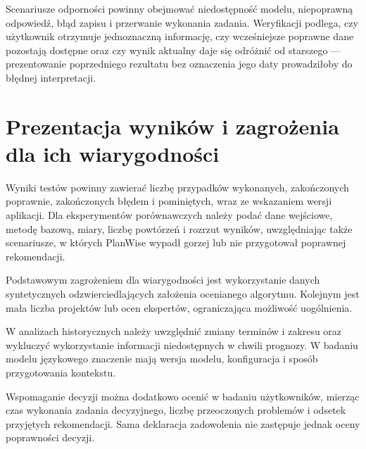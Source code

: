 Scenariusze odporności powinny obejmować niedostępność modelu, niepoprawną odpowiedź, błąd zapisu i przerwanie wykonania zadania. Weryfikacji podlega, czy użytkownik otrzymuje jednoznaczną informację, czy wcześniejsze poprawne dane pozostają dostępne oraz czy wynik aktualny daje się odróżnić od starszego — prezentowanie poprzedniego rezultatu bez oznaczenia jego daty prowadziłoby do błędnej interpretacji.

\section{Prezentacja wyników i zagrożenia dla ich wiarygodności}

Wyniki testów powinny zawierać liczbę przypadków wykonanych, zakończonych poprawnie, zakończonych błędem i pominiętych, wraz ze wskazaniem wersji aplikacji. Dla eksperymentów porównawczych należy podać dane wejściowe, metodę bazową, miary, liczbę powtórzeń i rozrzut wyników, uwzględniając także scenariusze, w których PlanWise wypadł gorzej lub nie przygotował poprawnej rekomendacji.

%

Podstawowym zagrożeniem dla wiarygodności jest wykorzystanie danych syntetycznych odzwierciedlających założenia ocenianego algorytmu. Kolejnym jest mała liczba projektów lub ocen ekspertów, ograniczająca możliwość uogólnienia.

W analizach historycznych należy uwzględnić zmiany terminów i zakresu oraz wykluczyć wykorzystanie informacji niedostępnych w chwili prognozy. W badaniu modelu językowego znaczenie mają wersja modelu, konfiguracja i sposób przygotowania kontekstu.

Wspomaganie decyzji można dodatkowo ocenić w badaniu użytkowników, mierząc czas wykonania zadania decyzyjnego, liczbę przeoczonych problemów i odsetek przyjętych rekomendacji. Sama deklaracja zadowolenia nie zastępuje jednak oceny poprawności decyzji.

